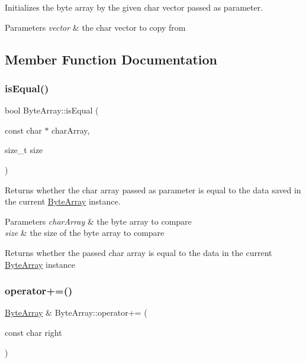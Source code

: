 Initializes the byte array by the given char vector passed as parameter. 


\begin{DoxyParams}{Parameters}
{\em vector} & the char vector to copy from \\
\hline
\end{DoxyParams}


\subsection{Member Function Documentation}
\mbox{\label{class_byte_array_a4c0af1c1fe9ee1e6fa1e8ce7b0bde83a}} 
\subsubsection{\texorpdfstring{isEqual()}{isEqual()}}
{\footnotesize\ttfamily bool Byte\+Array\+::is\+Equal (\begin{DoxyParamCaption}\item[{const char $\ast$}]{char\+Array,  }\item[{size\+\_\+t}]{size }\end{DoxyParamCaption})}



Returns whether the char array passed as parameter is equal to the data saved in the current \mbox{\hyperlink{class_byte_array}{Byte\+Array}} instance. 


\begin{DoxyParams}{Parameters}
{\em char\+Array} & the byte array to compare \\
\hline
{\em size} & the size of the byte array to compare \\
\hline
\end{DoxyParams}
\begin{DoxyReturn}{Returns}
whether the passed char array is equal to the data in the current \mbox{\hyperlink{class_byte_array}{Byte\+Array}} instance 
\end{DoxyReturn}
\mbox{\label{class_byte_array_aa8900e73d7ba3cea9aca18d037a2d017}} 
\subsubsection{\texorpdfstring{operator+=()}{operator+=()}\hspace{0.1cm}{\footnotesize\ttfamily [1/2]}}
{\footnotesize\ttfamily \mbox{\hyperlink{class_byte_array}{Byte\+Array}} \& Byte\+Array\+::operator+= (\begin{DoxyParamCaption}\item[{const char}]{right }\end{DoxyParamCaption})}



